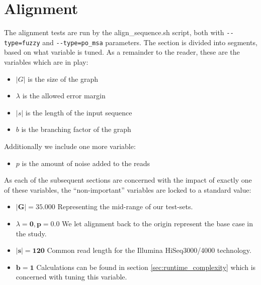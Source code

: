 \documentclass[thesis.tex]{subfiles}
\begin{document}
\section{Alignment}
The alignment tests are run by the align\_sequence.sh script, both with \texttt{-{}-type=fuzzy} and \texttt{-{}-type=po\_msa} parameters. The section is divided into segments, based on what variable is tuned. As a remainder to the reader, these are the variables which are in play:
\begin{itemize}
  \item $|G|$ is the size of the graph
  \item $\lambda$ is the allowed error margin
  \item $|s|$ is the length of the input sequence
  \item $b$ is the branching factor of the graph
\end{itemize}
Additionally we include one more variable:
\begin{itemize}
  \item $p$ is the amount of noise added to the reads
\end{itemize}
As each of the subsequent sections are concerned with the impact of exactly one of these variables, the ``non-important'' variables are locked to a standard value:
\begin{itemize}
  \item $\mathbf{|G|=35.000}$ Representing the mid-range of our test-sets.
  \item $\lambda\mathbf{=0, p=0.0}$ We let alignment back to the origin represent the base case in the study.
  \item $\mathbf{|s|=120}$ Common read length for the Illumina HiSeq3000/4000 technology.
  \item $\mathbf{b=1}$ Calculations can be found in section \ref{sec:runtime_complexity} which is concerned with tuning this variable.
\end{itemize}
\end{document}
